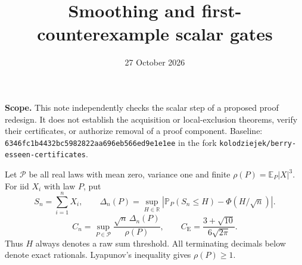 \documentclass[11pt,a4paper]{article}
\title{\vspace{-1.5em}Smoothing and first-counterexample scalar gates}
\author{}
\date{27 October 2026}
\newcommand{\E}{\mathbb E}
\newcommand{\Pp}{\mathbb P}
\newcommand{\CE}{C_{\mathrm E}}
\begin{document}
\maketitle
\vspace{-2.5em}
\noindent\textbf{Scope.}
This note independently checks the scalar step of a proposed proof redesign.
It does not establish the acquisition or local-exclusion theorems, verify their
certificates, or authorize removal of a proof component. Baseline:
\texttt{6346fc1b4432bc5982822aa696eb566ed9e1e1ee} in the fork
\texttt{kolodziejek/berry-esseen-certificates}.

Let $\mathcal P$ be all real laws with mean zero, variance one and finite
$\rho(P)=\E_P|X|^3$. For iid $X_i$ with law $P$, put
\[
 S_n=\sum_{i=1}^nX_i,\qquad
 \Delta_n(P)=\sup_{H\in\mathbb R}
       |\Pp_P(S_n\le H)-\Phi(H/\sqrt n)|.
\]
\[
 C_n=\sup_{P\in\mathcal P}\frac{\sqrt n\,\Delta_n(P)}{\rho(P)},\qquad
 \CE=\frac{3+\sqrt{10}}{6\sqrt{2\pi}}.
\]
Thus $H$ always denotes a raw sum threshold. All terminating decimals below
denote exact rationals. Lyapunov's inequality gives $\rho(P)\ge1$.
\end{document}
